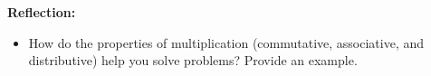 \documentclass[11pt]{article}
\begin{document}

\begin{tcolorbox}[colframe=black!60, colback=white, 
coltitle=black, colbacktitle=black!15, fonttitle=\bfseries\Large, 
title=Exit Ticket, halign title=center, left=10pt, right=10pt, top=10pt, bottom=15pt]
\textbf{Reflection:}
\begin{itemize}
    \item How do the properties of multiplication (commutative, associative, and distributive) help you solve problems? Provide an example.
\vspace{1cm}
\end{itemize}
\end{tcolorbox}
\end{document}
